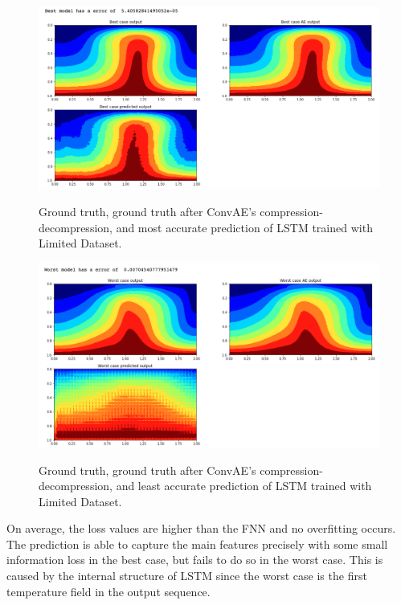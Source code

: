 \begin{figure}[H]
    \caption{Ground truth, ground truth after ConvAE's compression-decompression, and most accurate prediction of LSTM trained with Limited Dataset.}
    \includegraphics[scale=0.5]{figures/mantle_convection_images/limited_dataset/LSTM_Best.png}
    \label{figure:LSTM_limited_best}
\end{figure}

\begin{figure}[H]
    \caption{Ground truth, ground truth after ConvAE's compression-decompression, and least accurate prediction of LSTM trained with Limited Dataset.}
    \includegraphics[scale=0.5]{figures/mantle_convection_images/limited_dataset/LSTM_Worst.png}
    \label{figure:LSTM_limited_worst}
\end{figure}

On average, the loss values are higher than the FNN and no overfitting occurs. The prediction is able to capture the main features precisely with some small information loss in the best case, but fails to do so in the worst case. This is caused by the internal structure of LSTM since the worst case is the first temperature field in the output sequence.

